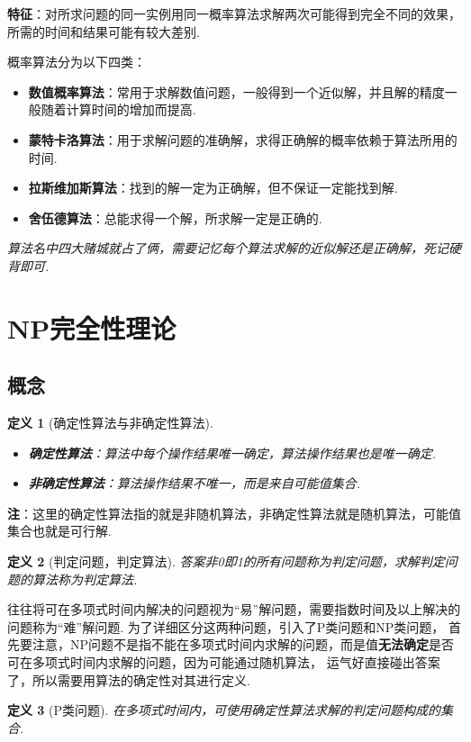 \documentclass[12pt, a4paper, oneside]{ctexart}
\newtheorem{definition}{定义}[section]
\numberwithin{equation}{section}  %
\theoremstyle{definition}
\begin{document}
\textbf{特征}：对所求问题的同一实例用同一概率算法求解两次可能得到完全不同的效果，所需的时间和结果可能有较大差别.

概率算法分为以下四类：
\begin{itemize}
    \item \textbf{数值概率算法}：常用于求解数值问题，一般得到一个近似解，并且解的精度一般随着计算时间的增加而提高.
    \item \textbf{蒙特卡洛算法}：用于求解问题的准确解，求得正确解的概率依赖于算法所用的时间.
    \item \textbf{拉斯维加斯算法}：找到的解一定为正确解，但不保证一定能找到解.
    \item \textbf{舍伍德算法}：总能求得一个解，所求解一定是正确的.
\end{itemize}
\textit{算法名中四大赌城就占了俩，需要记忆每个算法求解的近似解还是正确解，死记硬背即可.}

\section{NP完全性理论}
\subsection{概念}
\begin{definition}[确定性算法与非确定性算法]\ 
    \begin{itemize}
        \item \textbf{确定性算法}：算法中每个操作结果唯一确定，算法操作结果也是唯一确定.
        \item \textbf{非确定性算法}：算法操作结果不唯一，而是来自可能值集合.
    \end{itemize}
\end{definition}
\textbf{注}：这里的确定性算法指的就是非随机算法，非确定性算法就是随机算法，可能值集合也就是可行解.

\begin{definition}[判定问题，判定算法]
    答案非0即1的所有问题称为判定问题，求解判定问题的算法称为判定算法.
\end{definition}

往往将可在多项式时间内解决的问题视为“易”解问题，需要指数时间及以上解决的问题称为“难”解问题. 为了详细区分这两种问题，引入了P类问题和NP类问题，
首先要注意，NP问题不是指不能在多项式时间内求解的问题，而是值\textbf{无法确定}是否可在多项式时间内求解的问题，因为可能通过随机算法，
运气好直接碰出答案了，所以需要用算法的确定性对其进行定义.

\begin{definition}[P类问题]
    在多项式时间内，可使用确定性算法求解的判定问题构成的集合.
\end{definition}
\end{document}
